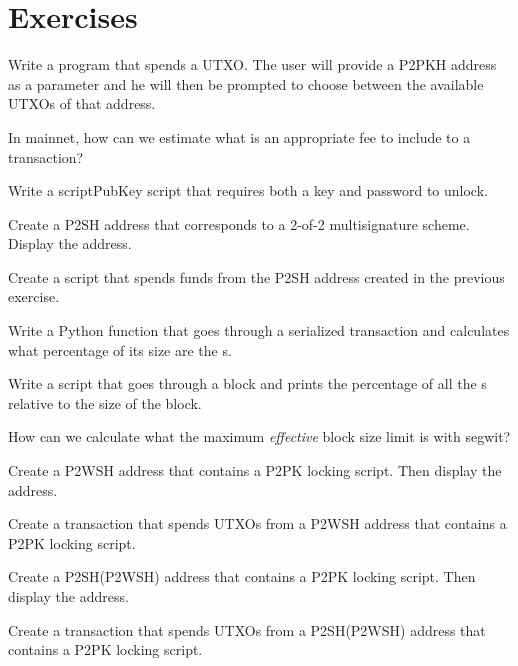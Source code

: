 \vspace{1em}


\section{Exercises}

\begin{exercise}
Write a program that spends a UTXO. The user will provide a P2PKH address as a parameter and he will then be prompted to choose between the available UTXOs of that address.
\end{exercise}

\begin{exercise}
In mainnet, how can we estimate what is an appropriate fee to include to a transaction?
\end{exercise}

\begin{exercise}
Write a scriptPubKey script that requires both a key and password to unlock.
\end{exercise}

\begin{exercise}
Create a P2SH address that corresponds to a 2-of-2 multisignature scheme. Display the address.
\end{exercise}

\begin{exercise}
Create a script that spends funds from the P2SH address created in the previous exercise.
\end{exercise}

\begin{exercise}
Write a Python function that goes through a serialized transaction and calculates what percentage of its size are the s.
\end{exercise}

\begin{exercise}
Write a script that goes through a block and prints the percentage of all the s relative to the size of the block.
\end{exercise}

\begin{exercise}
How can we calculate what the maximum \emph{effective} block size limit is with segwit?
\end{exercise}

\begin{exercise}
Create a P2WSH address that contains a P2PK locking script. Then display the address.
\end{exercise}

\begin{exercise}
Create a transaction that spends UTXOs from a P2WSH address that contains a P2PK locking script.
\end{exercise}

\begin{exercise}
Create a P2SH(P2WSH) address that contains a P2PK locking script. Then display the address.
\end{exercise}

\begin{exercise}
Create a transaction that spends UTXOs from a P2SH(P2WSH) address that contains a P2PK locking script.
\end{exercise}
